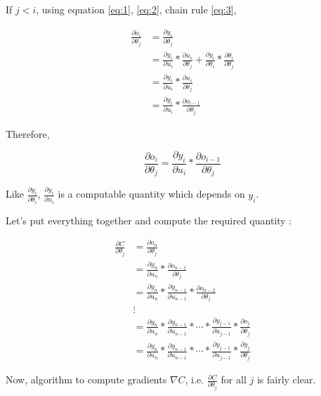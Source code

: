 \documentclass[a4paper]{tufte-handout}
\begin{document}
If \(j < i\), using equation \eqref{eq:1}, \eqref{eq:2}, chain rule \eqref{eq:3},

\begin{align*}
\frac{\partial o_i}{\partial \theta_j} &= \frac{\partial y_i}{\partial \theta_j}\\
&= \frac{\partial y_i}{\partial u_i} * \frac{\partial u_i}{\partial \theta_j} + \frac{\partial y_i}{\partial \theta_i} * \frac{\partial \theta_i}{\partial \theta_j}\\
&= \frac{\partial y_i}{\partial u_i} * \frac{\partial u_i}{\partial \theta_j}\\
&= \frac{\partial y_i}{\partial u_i} * \frac{\partial o_{i-1}}{\partial \theta_j}
\end{align*}


Therefore,

\begin{equation}
\frac{\partial o_i}{\partial \theta_j} = \frac{\partial y_i}{\partial u_i} * \frac{\partial o_{i-1}}{\partial \theta_j}
\label{eq:6}
\end{equation}

Like \(\frac{\partial y_i}{\partial \theta_i}\),
\(\frac{\partial y_i}{\partial u_i}\) is a computable quantity which
depends on \(y_i\).

\noindent Let's put everything together and compute the required quantity
:

\begin{align*}
\frac{\partial C}{\partial \theta_j} &= \frac{\partial o_n}{\partial \theta_j}\\
&= \frac{\partial y_n}{\partial u_n} * \frac{\partial o_{n-1}}{\partial \theta_j}\\
&= \frac{\partial y_n}{\partial u_n} * \frac{\partial y_{n-1}}{\partial u_{n-1}} * \frac{\partial o_{n-2}}{\partial \theta_j} \\
&\vdots \\
&= \frac{\partial y_n}{\partial u_n} * \frac{\partial y_{n-1}}{\partial u_{n-1}} * \cdots * \frac{\partial y_{j-1}}{\partial u_{j-1}} * \frac{\partial o_j}{\partial \theta_j}\\
&= \frac{\partial y_n}{\partial u_n} * \frac{\partial y_{n-1}}{\partial u_{n-1}} * \cdots * \frac{\partial y_{j-1}}{\partial u_{j-1}} * \frac{\partial y_j}{\partial \theta_j}
\end{align*}

Now, algorithm to compute gradients \(\nabla C\), i.e.
\(\frac{\partial C}{\partial \theta_j}\) for all \(j\) is fairly clear.
\end{document}
